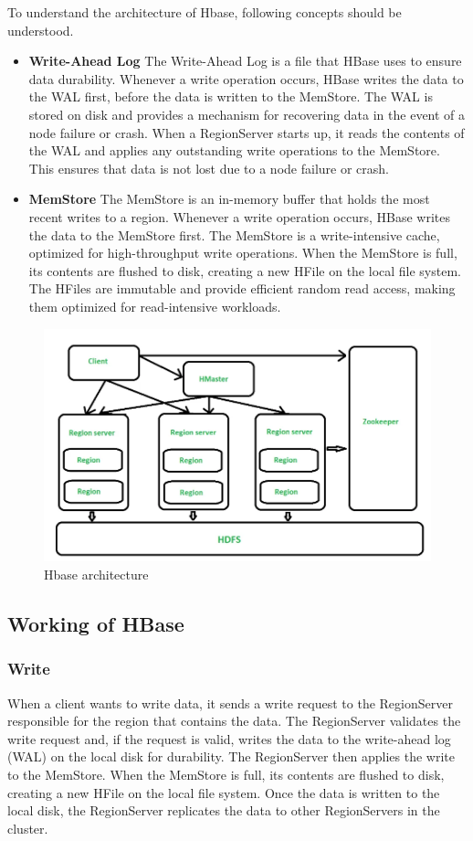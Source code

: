 \documentclass[12pt]{article}
\begin{document}
To understand the architecture of Hbase, following concepts should be understood.
\begin{itemize}
    \item {\bfseries Write-Ahead Log}
    The Write-Ahead Log is a file that HBase uses to ensure data durability. Whenever a write operation occurs, HBase writes the data to the WAL first, before the data is written to the MemStore. The WAL is stored on disk and provides a mechanism for recovering data in the event of a node failure or crash. When a RegionServer starts up, it reads the contents of the WAL and applies any outstanding write operations to the MemStore. This ensures that data is not lost due to a node failure or crash.
    \item {\bfseries MemStore}
    The MemStore is an in-memory buffer that holds the most recent writes to a region. Whenever a write operation occurs, HBase writes the data to the MemStore first. The MemStore is a write-intensive cache, optimized for high-throughput write operations. When the MemStore is full, its contents are flushed to disk, creating a new HFile on the local file system. The HFiles are immutable and provide efficient random read access, making them optimized for read-intensive workloads.
\end{itemize}
\begin{figure}[h!]
    \centering
    \includegraphics[scale = 0.5]{images/Hbase.png}
    \caption{Hbase architecture}
\end{figure}
\subsection{Working of HBase}
\subsubsection{Write}
When a client wants to write data, it sends a write request to the RegionServer responsible for the region that contains the data. The RegionServer
validates the write request and, if the request is valid, writes the data to the write-ahead log (WAL) on the local disk for durability. The RegionServer then applies the write to the MemStore. When the MemStore is full, its contents are flushed to disk, creating a new HFile on the local file system. Once the data is written to the local disk, the RegionServer replicates the data to other RegionServers in the cluster.
\end{document}
